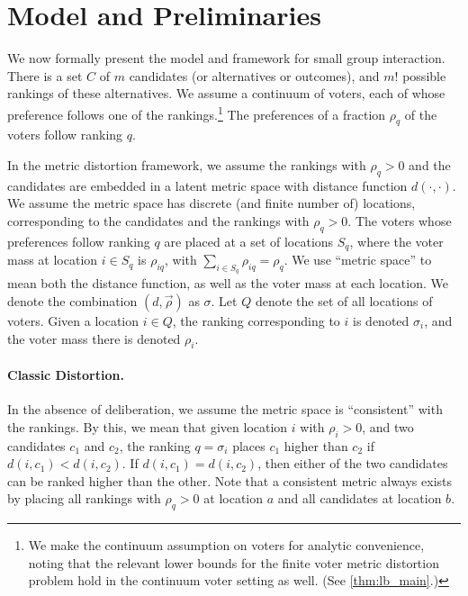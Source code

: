 \section{Model and Preliminaries}
\label{sec:prelim}
We now formally present the model and framework for small group interaction. There is a set $C$ of $m$ candidates (or alternatives or outcomes), and $m!$ possible rankings of these alternatives. We assume a continuum of voters, each of whose preference follows one of the rankings.\footnote{We make the continuum assumption on voters for analytic convenience, noting that the relevant lower bounds for the finite voter metric distortion problem hold in the continuum voter setting as well. (See \cref{thm:lb_main}.)} The preferences of a fraction $\rho_{q}$ of the voters follow ranking $q$. %

In the metric distortion framework, we assume the rankings with $\rho_q > 0$ and the candidates are embedded in a latent metric space with distance function $d(\cdot, \cdot)$. We assume the metric space has discrete (and finite number of) locations, corresponding to the candidates and the rankings with $\rho_q > 0$. The voters whose preferences follow ranking $q$ are placed at a set of locations $S_q$, where the voter mass at location $i \in S_q$ is $\rho_{iq}$, with $\sum_{i \in S_q} \rho_{iq} = \rho_q$.  We use ``metric space'' to mean both the distance function, as well as the voter mass at each location. We denote the combination $(d, \vec{\rho})$ as $\sigma$. Let $Q$ denote the set of all locations of voters. Given a location $i \in Q$, the ranking corresponding to $i$ is denoted $\sigma_i$, and the voter mass there is denoted $\rho_i$.

\paragraph{Classic Distortion.} In the absence of deliberation, we assume the metric space is ``consistent'' with the rankings. By this, we mean that given location $i$ with $\rho_i > 0$, and two candidates $c_1$ and $c_2$,  the ranking $q = \sigma_i$ places $c_1$ higher than $c_2$  if $d(i,c_1) < d(i,c_2)$. If $d(i,c_1) = d(i,c_2)$, then either of the two candidates can be ranked higher than the other.  Note that a consistent metric always exists by placing all rankings with $\rho_q > 0$ at location $a$ and all candidates at location $b$.

